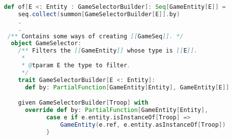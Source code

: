 \begin{lstlisting}[language=Scala, label=code:gameselector, caption= Creazione di una sequenza di gioco di soli tipi Troop.]
def of[E <: Entity : GameSelectorBuilder]: Seq[GameEntity[E]] =
    seq.collect(summon[GameSelectorBuilder[E]].by) 
    .
    .
 /** Contains some ways of creating [[GameSeq]]. */
  object GameSelector:
    /** Filters the [[GameEntity]] whose type is [[E]].
     *
     * @tparam E the type to filter.
     */
    trait GameSelectorBuilder[E <: Entity]:
      def by: PartialFunction[GameEntity[Entity], GameEntity[E]]

    given GameSelectorBuilder[Troop] with
      override def by: PartialFunction[GameEntity[Entity],               GameEntity[Troop]] = {
            case e if e.entity.isInstanceOf[Troop] => 
                GameEntity(e.ref, e.entity.asInstanceOf[Troop])
            }
\end{lstlisting}



